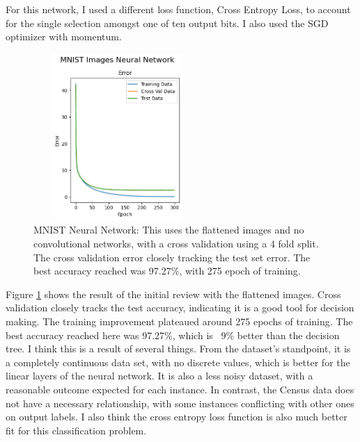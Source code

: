 \documentclass[letterpaper]{article} %
\begin{document}
For this network, I used a different loss function, Cross Entropy Loss, to account for the single selection amongst one of ten output bits.  I also used the SGD optimizer with momentum. 

\begin{figure}[htb]
\centering
\includegraphics[width=2.5in, height=2.5in]{figures/MNIST_Images_Neural_Network_Error_MNIST.png}
\caption{MNIST Neural Network:  This uses the flattened images and no convolutional networks, with a cross validation using a 4 fold split.  The cross validation error closely tracking the test set error. The best accuracy reached was 97.27\%,  with 275 epoch of training.  }
\label{fig:MNIST_Error_neural_network}
\end{figure}

Figure \ref{fig:MNIST_Error_neural_network} shows the result of the initial review with the flattened images.  Cross validation closely tracks the test accuracy, indicating it is a good tool for decision making.  The training improvement plateaued around 275 epochs of training.  The best accuracy reached here was 97.27\%, which is ~9\% better than the decision tree.  I think this is a result of several things.  From the dataset's standpoint, it is a completely continuous data set, with no discrete values, which is better for the linear layers of the neural network.  It is also a less noisy dataset, with a reasonable outcome expected for each instance.  In contrast, the Census data does not have a necessary relationship, with some instances conflicting with other ones on output labels.  I also think the cross entropy loss function is also much better fit for this classification problem.
\end{document}
